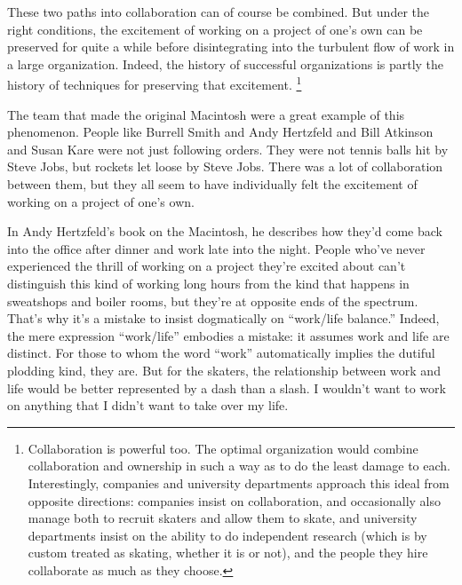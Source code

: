 \documentclass[12pt]{book}
\begin{document}
These two paths into collaboration can of course be combined. But under
the right conditions, the excitement of working on a project of one's
own can be preserved for quite a while before disintegrating into the
turbulent flow of work in a large organization. Indeed, the history of
successful organizations is partly the history of techniques for
preserving that excitement. \footnote{Collaboration is powerful too. The optimal organization would
combine collaboration and ownership in such a way as to do the least
damage to each. Interestingly, companies and university departments
approach this ideal from opposite directions: companies insist on
collaboration, and occasionally also manage both to recruit skaters and
allow them to skate, and university departments insist on the ability to
do independent research (which is by custom treated as skating, whether
it is or not), and the people they hire collaborate as much as they
choose.}

The team that made the original Macintosh were a great example of this
phenomenon. People like Burrell Smith and Andy Hertzfeld and Bill
Atkinson and Susan Kare were not just following orders. They were not
tennis balls hit by Steve Jobs, but rockets let loose by Steve Jobs.
There was a lot of collaboration between them, but they all seem to have
individually felt the excitement of working on a project of one's own.

In Andy Hertzfeld's book on the Macintosh, he describes how they'd come
back into the office after dinner and work late into the night. People
who've never experienced the thrill of working on a project they're
excited about can't distinguish this kind of working long hours from the
kind that happens in sweatshops and boiler rooms, but they're at
opposite ends of the spectrum. That's why it's a mistake to insist
dogmatically on ``work/life balance.'' Indeed, the mere expression
``work/life'' embodies a mistake: it assumes work and life are distinct.
For those to whom the word ``work'' automatically implies the dutiful
plodding kind, they are. But for the skaters, the relationship between
work and life would be better represented by a dash than a slash. I
wouldn't want to work on anything that I didn't want to take over my
life.
\end{document}
